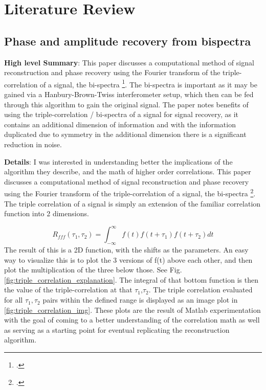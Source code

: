\documentclass[a4paper]{article}
\begin{document}
\section{Literature Review}
\subsection{Phase and amplitude recovery from bispectra}
\textbf{High level Summary}: This paper discusses a computational method of signal reconstruction and phase recovery using the Fourier transform of the triple-correlation of a signal, the bi-spectra \footcite{Bartelt:84}. The bi-spectra is important as it may be gained via a Hanbury-Brown-Twiss interferometer setup, which then can be fed through this algorithm to gain the original signal. The paper notes benefits of using the triple-correlation / bi-spectra of a signal for signal recovery, as it contains an additional dimension of information and with the information duplicated due to symmetry in the additional dimension there is a significant reduction in noise. 

\textbf{Details}:  I was interested in understanding better the implications of the algorithm they describe, and the math of higher order correlations. This paper discusses a computational method of signal reconstruction and phase recovery using the Fourier transform of the triple-correlation of a signal, the bi-spectra \footcite{Bartelt:84}. The triple correlation of a signal is simply an extension of the familiar correlation function into 2 dimensions.

\[ 
R_{fff}\left(\tau_1,\tau_2\right)=\int_{-\infty}^{\infty}f\left(t\right)f\left(t+\tau_1\right)f\left(t+\tau_2\right)dt
\]
The result of this is a 2D function, with the shifts as the parameters. An easy way to visualize this is to plot the 3 versions of f(t) above each other, and then plot the multiplication of the three below those. See Fig.\ref{fig:triple_correlation_explanation}. The integral of that bottom function is then the value of the triple-correlation at that $\tau_1$,$\tau_2$. The triple correlation evaluated for all \(\tau_1, \tau_2\) pairs within the defined range is displayed as an image plot in \ref{fig:triple_correlation_img}. These plots are the result of Matlab experimentation with the goal of coming to a better understanding of the correlation math as well as serving as a starting point for eventual replicating the reconstruction algorithm.
\end{document}
